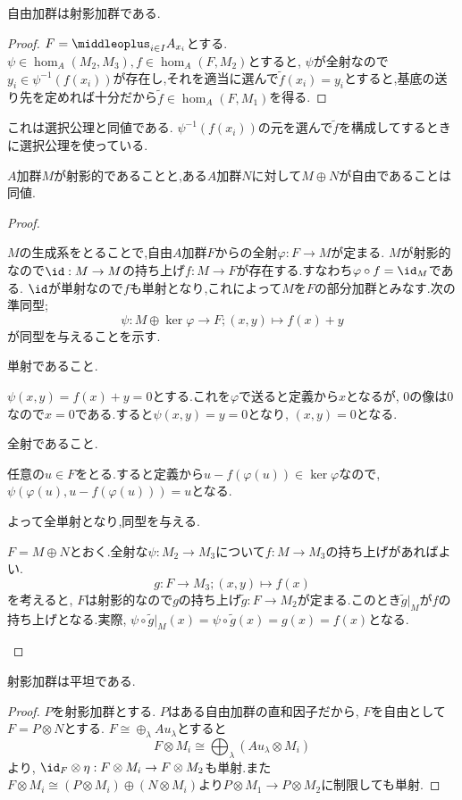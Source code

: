 \begin{prop}\label{prop:自由加群は射影加群}
	自由加群は射影加群である.
\end{prop}
\begin{proof}
	$F=\middleoplus_{i\in I}A_{x_i}$とする. $\psi\in\hom_A(M_2,M_3),f\in\hom_A(F,M_2)$とすると, $\psi$が全射なので$y_i\in\psi^{-1}(f(x_i))$が存在し,それを適当に選んで$\widetilde{f}(x_i)=y_i$とすると,基底の送り先を定めれば十分だから$\widetilde{f}\in\hom_A(F,M_1)$を得る.
\end{proof}

これは選択公理と同値である. $\psi^{-1}(f(x_i))$の元を選んで$\widetilde{f}$を構成してするときに選択公理を使っている.
\begin{thm}
	$A$加群$M$が射影的であることと,ある$A$加群$N$に対して$M\oplus N$が自由であることは同値.
\end{thm}
\begin{proof}
	\begin{eqv}
		\item 
		$M$の生成系をとることで,自由$A$加群$F$からの全射$\varphi:F\to M$が定まる. $M$が射影的なので$\id:M\to M$の持ち上げ$f:M\to F$が存在する.すなわち$\varphi\circ f=\id_M$である. $\id$が単射なので$f$も単射となり,これによって$M$を$F$の部分加群とみなす.次の準同型;
		\[\psi:M\oplus \ker\varphi\to F;(x,y)\mapsto f(x)+y\]
		が同型を与えることを示す.
		
		\begin{mrkw}
			\item 単射であること.
			
			$\psi(x,y)=f(x)+y=0$とする.これを$\varphi$で送ると定義から$x$となるが, 0の像は0なので$x=0$である.すると$\psi(x,y)=y=0$となり, $(x,y)=0$となる.
			\item 全射であること.
			
			任意の$u\in F$をとる.すると定義から$u-f(\varphi(u))\in\ker\varphi$なので, $\psi(\varphi(u),u-f(\varphi(u)))=u$となる.
		\end{mrkw}
		よって全単射となり,同型を与える.
		\item 
		$F=M\oplus N$とおく.全射な$\psi:M_2\to M_3$について$f:M\to M_3$の持ち上げがあればよい.
		\[g:F\to M_3;(x,y)\mapsto f(x)\]
		を考えると, $F$は射影的なので$g$の持ち上げ$\widetilde{g}:F\to M_2$が定まる.このとき$\widetilde{g}|_M$が$f$の持ち上げとなる.実際, $\psi\circ\widetilde{g}|_M(x)=\psi\circ\widetilde{g}(x)=g(x)=f(x)$となる.
	\end{eqv}
\end{proof}

\begin{thm}
	射影加群は平坦である.
\end{thm}
\begin{proof}
	$P$を射影加群とする. $P$はある自由加群の直和因子だから, $F$を自由として$F=P\otimes N$とする. $F\cong\oplus_\lambda Au_\lambda$とすると
	\[F\otimes M_i\cong \bigoplus_\lambda (Au_\lambda\otimes M_i)\]
	より, $\id_{F}\otimes\eta:F\otimes M_i\to F\otimes M_2$も単射.また$F\otimes M_i\cong (P\otimes M_i)\oplus (N\otimes M_i)$より$P\otimes M_1\to P\otimes M_2$に制限しても単射.
\end{proof}

